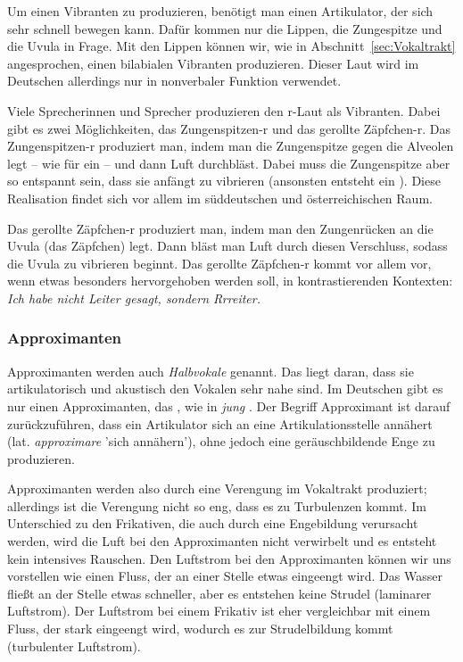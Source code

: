 Um einen Vibranten zu produzieren, benötigt man einen Artikulator, der sich sehr schnell bewegen kann. Dafür kommen nur die Lippen, die Zungespitze und die Uvula in Frage. Mit den Lippen können wir, wie in Abschnitt~\ref{sec:Vokaltrakt} angesprochen, einen bilabialen Vibranten produzieren. Dieser Laut wird im Deutschen allerdings nur in nonverbaler Funktion verwendet.

Viele Sprecherinnen und Sprecher produzieren den r-Laut als Vibranten. Dabei gibt es zwei Möglichkeiten, das Zungenspitzen-r und das gerollte Zäpfchen-r. Das Zungenspitzen-r \textipa{[r]} produziert man, indem man die Zungenspitze gegen die Alveolen legt -- wie für ein \textipa{[t]} -- und dann Luft durchbläst. Dabei muss die Zungenspitze aber so entspannt sein, dass sie anfängt zu vibrieren (ansonsten entsteht ein \textipa{[s]}). Diese Realisation findet sich vor allem im süddeutschen und österreichischen Raum.

Das gerollte Zäpfchen-r \textipa{[\;R]} produziert man, indem man den Zungenrücken an die Uvula (das Zäpfchen) legt. Dann bläst man Luft durch diesen Verschluss, sodass die Uvula zu vibrieren beginnt. Das gerollte Zäpfchen-r kommt vor allem vor, wenn etwas besonders hervorgehoben werden soll, \zB in kontrastierenden Kontexten: \textit{Ich habe nicht Leiter gesagt, sondern Rrreiter.}

\subsubsection{Approximanten}

Approximanten werden auch  \textit{Halbvokale} genannt. Das liegt daran, dass sie artikulatorisch und akustisch den Vokalen sehr nahe sind. Im Deutschen gibt es nur einen Approximanten, das \textipa{[j]}, wie in \textit{jung} \textipa{[jUN]}. Der Begriff Approximant ist darauf zurückzuführen, dass ein Artikulator sich an eine Artikulationsstelle annähert (lat. \textit{approximare} 'sich annähern'), ohne jedoch eine geräuschbildende Enge zu produzieren.

Approximanten werden also durch eine Verengung im Vokaltrakt produziert; allerdings ist die Verengung nicht so eng, dass es zu Turbulenzen kommt. Im Unterschied zu den Frikativen, die auch durch eine Engebildung verursacht werden, wird die Luft bei den Approximanten nicht verwirbelt und es entsteht kein intensives Rauschen. Den Luftstrom bei den Approximanten können wir uns vorstellen wie einen Fluss, der an einer Stelle etwas eingeengt wird. Das Wasser fließt an der Stelle etwas schneller, aber es entstehen keine Strudel (laminarer Luftstrom). Der Luftstrom bei einem Frikativ ist eher vergleichbar mit einem Fluss, der stark eingeengt wird, wodurch es zur Strudelbildung kommt (turbulenter Luftstrom). 


